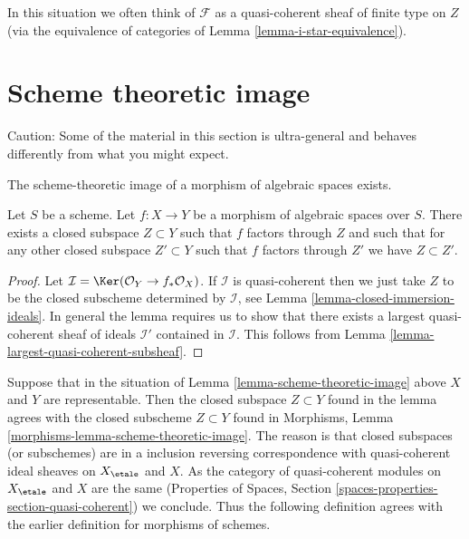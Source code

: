 \noindent
In this situation we often think of $\mathcal{F}$ as a quasi-coherent
sheaf of finite type on $Z$ (via the equivalence of categories of
Lemma \ref{lemma-i-star-equivalence}).






\section{Scheme theoretic image}
\label{section-scheme-theoretic-image}

\noindent
Caution: Some of the material in this section is ultra-general and
behaves differently from what you might expect.

\begin{lemma}
\label{lemma-scheme-theoretic-image}
\begin{slogan}
The scheme-theoretic image of a morphism of algebraic spaces exists.
\end{slogan}
Let $S$ be a scheme. Let $f : X \to Y$ be a morphism of algebraic spaces
over $S$. There exists a closed subspace $Z \subset Y$ such that $f$ factors
through $Z$ and such that for any other closed subspace $Z' \subset Y$
such that $f$ factors through $Z'$ we have $Z \subset Z'$.
\end{lemma}

\begin{proof}
Let $\mathcal{I} = \Ker(\mathcal{O}_Y \to f_*\mathcal{O}_X)$.
If $\mathcal{I}$ is quasi-coherent then we just take $Z$ to be the
closed subscheme determined by $\mathcal{I}$, see
Lemma \ref{lemma-closed-immersion-ideals}.
In general the lemma requires us to show that there exists
a largest quasi-coherent sheaf of ideals $\mathcal{I}'$ contained in
$\mathcal{I}$.
This follows from Lemma \ref{lemma-largest-quasi-coherent-subsheaf}.
\end{proof}

\noindent
Suppose that in the situation of Lemma \ref{lemma-scheme-theoretic-image}
above $X$ and $Y$ are representable. Then the closed subspace $Z \subset Y$
found in the lemma agrees with the closed subscheme $Z \subset Y$ found in
Morphisms, Lemma \ref{morphisms-lemma-scheme-theoretic-image}.
The reason is that closed subspaces (or subschemes) are in a inclusion
reversing correspondence with quasi-coherent ideal sheaves on
$X_\etale$ and $X$. As the category of quasi-coherent modules
on $X_\etale$ and $X$ are the same
(Properties of Spaces, Section \ref{spaces-properties-section-quasi-coherent})
we conclude. Thus the following definition agrees with the earlier
definition for morphisms of schemes.

